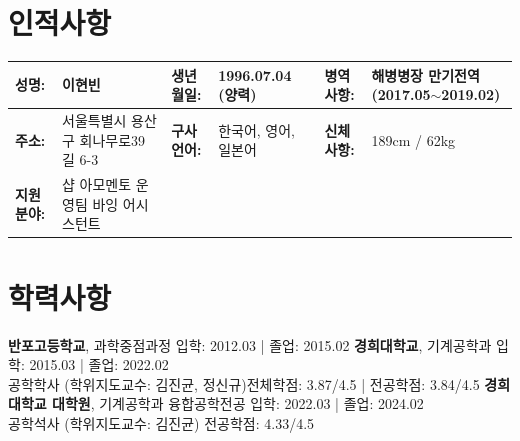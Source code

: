 \documentclass[a4paper,10pt]{extarticle}
\begin{document}
\renewcommand*{\arraystretch}{1.5}
\noindent
\section*{인적사항}
\begin{center}
    \vspace*{-0.8cm}
    \noindent
    \begin{longtable}{LRLRLR}
        \textbf{성명:}   & 이현빈                   & \textbf{생년월일:} & 1996.07.04 (양력) & \textbf{병역사항:}  & 해병병장 만기전역 \small{(2017.05$\sim$2019.02)} \\
        \hline
        \textbf{주소:}   & 서울특별시 용산구 회나무로39길 6-3 & \textbf{구사언어:} & 한국어, 영어, 일본어    & \textbf{신체사항: } & 189cm / 62kg                             \\
        \hline
        \textbf{지원분야:} & {샵 아모멘토 운영팀 바잉 어시스턴트}
    \end{longtable}
\end{center}



\section*{학력사항}
\noindent
\textbf{반포고등학교}, 과학중점과정 \hfill 입학: 2012.03 | 졸업: 2015.02
\newline
\textbf{경희대학교}, 기계공학과 \hfill 입학: 2015.03 | 졸업: 2022.02\\ %
공학학사 (학위지도교수: 김진균, 정신규)\hfill 전체학점: 3.87/4.5 | 전공학점: 3.84/4.5 %
\newline
\textbf{경희대학교 대학원}, 기계공학과 융합공학전공 \hfill 입학: 2022.03 | 졸업: 2024.02\\ %
공학석사 (학위지도교수: 김진균) \hfill 전공학점: 4.33/4.5 %
\end{document}

